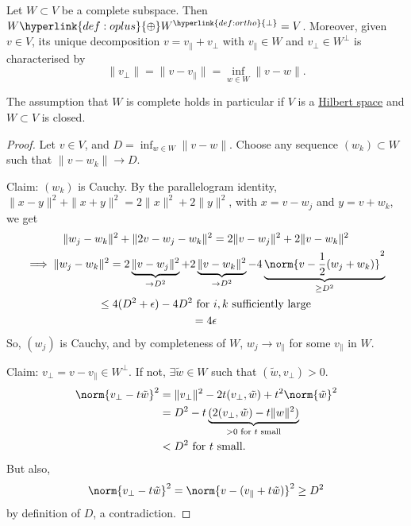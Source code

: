 \documentclass{article}
\begin{document}
\begin{thm}
    Let $W \subset V$ be a complete subspace. Then $W \hyperlink{def:oplus}{\oplus} W^{\hyperlink{def:ortho}{\perp}} = V$.
    Moreover, given $v \in V$, its unique decomposition $v = v_\parallel + v_\perp$ with $v_\parallel \in W$ and $v_\perp \in W^\perp$ is characterised by
    \begin{equation*}
        \|v_\perp\| = \|v - v_\parallel\| = \inf_{w \in W} \|v - w\| \tag{$*$} \label{eq:17star}.
    \end{equation*}
\end{thm}

The assumption that $W$ is complete holds in particular if $V$ is a \hyperlink{def:euclidean}{Hilbert space} and $W \subset V$ is closed.

\begin{proof}
    Let $v \in V$, and $D = \inf_{w \in W} \|v - w\|$. Choose any sequence $(w_k) \subset W$ such that $\|v - w_k\| \to D$.

    Claim: $(w_k)$ is Cauchy.
    By the parallelogram identity, $\|x - y\|^2 + \|x+y\|^2 = 2 \|x\|^2 + 2 \|y\|^2$, with $x = v-w_j$ and $y = v+w_k$, we get
    \begin{gather*}
        \|w_j - w_k\|^2 + \|2v - w_j - w_k\|^2 = 2 \|v - w_j\|^2 + 2 \|v - w_k\|^2 \\
        \implies \|w_j - w_k\|^2 = 2 \underbrace{\|v - w_j\|^2}_{\to D^2} + 2 \underbrace{\|v - w_k\|^2}_{\to D^2} - 4 \underbrace{\norm{v - \frac{1}{2}(w_j + w_k)}^2}_{\geq D^2} \\
        \leq 4(D^2 + \epsilon) - 4D^2 \text{ for $i, k$ sufficiently large} \\
        = 4\epsilon
    \end{gather*}
    So, $(w_j)$ is Cauchy, and by completeness of $W$, $w_j \to v_\parallel$ for some $v_\parallel$ in $W$.

    Claim: $v_\perp = v - v_\parallel \in W^\perp$. If not, $\exists \tilde{w} \in W$ such that $(\tilde{w}, v_\perp) > 0$.
    \begin{align*}
        \norm{v_\perp - t \tilde{w}}^2 &= \|v_\perp\|^2 - 2 t (v_\perp, \tilde{w}) + t^2 \norm{\tilde{w}}^2 \\
                                       &= D^2 - t\underbrace{(2 (v_\perp, \tilde{w}) - t \|w\|^2)}_{>0 \text{ for $t$ small}} \\
                                       &< D^2 \text{ for $t$ small.}
    \end{align*}
    But also,
    \begin{equation*}
        \norm{v_\perp - t \tilde{w}}^2 = \norm{v - (v_\parallel + t \tilde{w})}^2 \geq D^2
    \end{equation*}
    by definition of $D$, a contradiction.


\end{proof}
\end{document}
